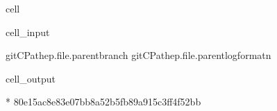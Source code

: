 \documentclass[letterpaper,table,10pt,english]{jupyterBook}
\begin{document}
\begin{sphinxuseclass}{cell}\begin{sphinxVerbatimInput}

\begin{sphinxuseclass}{cell_input}
\begin{sphinxVerbatim}[commandchars=\\\{\}]
git\PYGZhy{}CPathep.\PYGZus{}\PYGZus{}file\PYGZus{}\PYGZus{}.parentbranch
git\PYGZhy{}CPathep.\PYGZus{}\PYGZus{}file\PYGZus{}\PYGZus{}.parentlog\PYGZhy{}\PYGZhy{}format\PYGZhy{}n
\end{sphinxVerbatim}

\end{sphinxuseclass}\end{sphinxVerbatimInput}
\begin{sphinxVerbatimOutput}

\begin{sphinxuseclass}{cell_output}
\begin{sphinxVerbatim}[commandchars=\\\{\}]
* 
80e15ac8e83e07bb8a52b5fb89a915c3ff4f52bb
\end{sphinxVerbatim}

\end{sphinxuseclass}\end{sphinxVerbatimOutput}

\end{sphinxuseclass}
\end{document}
